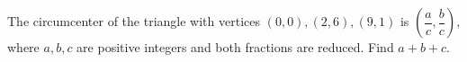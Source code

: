 The circumcenter of the triangle with vertices $(0,0),(2,6),(9,1)$ is $\left(\dfrac{a}{c},\dfrac{b}{c}\right)$, where $a,b,c$ are positive integers and both fractions are reduced. Find $a+b+c$.
